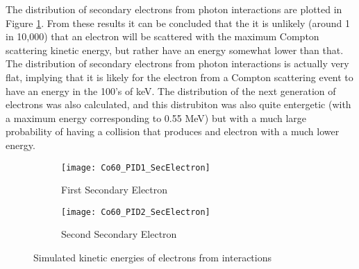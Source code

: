The distribution of secondary electrons from photon interactions are plotted in Figure \ref{fig:SecElecKinEDist}.
From these results it can be concluded that the it is unlikely (around 1 in 10,000) that an electron will be scattered with the maximum Compton scattering kinetic energy, but rather have an energy somewhat lower than that.
The distribution of secondary electrons from photon interactions is actually very flat, implying that it is likely for the electron from a Compton scattering event to have an energy in the 100's of keV.
The distribution of the next generation of electrons was also calculated, and this distrubiton was also quite entergetic (with a maximum energy corresponding to 0.55 MeV) but with a much large probability of having a collision that produces and electron with a much lower energy.
\begin{figure}[h]
    \centering
    \begin{subfigure}[b]{0.45\figurewidth}
        \texttt{[image: Co60\_PID1\_SecElectron]}
        \caption{First Secondary Electron}
    \end{subfigure}
    \begin{subfigure}[b]{0.45\figurewidth}
        \texttt{[image: Co60\_PID2\_SecElectron]}
        \caption{Second Secondary Electron}
    \end{subfigure}
    \caption{Simulated kinetic energies of electrons from  interactions}
    \label{fig:SecElecKinEDist}
\end{figure}
